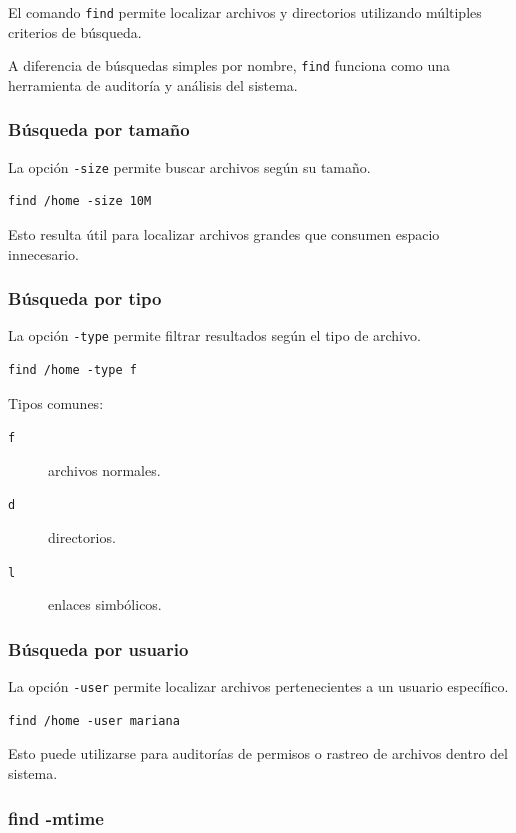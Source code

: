 \documentclass[11pt, letterpaper]{article}
\begin{document}
El comando \texttt{find} permite localizar archivos y directorios utilizando múltiples criterios de búsqueda.

A diferencia de búsquedas simples por nombre, \texttt{find} funciona como una herramienta de auditoría y análisis del sistema.
\subsubsection{Búsqueda por tamaño}
\label{sec:orgbc54884}

La opción \texttt{-size} permite buscar archivos según su tamaño.

\begin{verbatim}
find /home -size 10M
\end{verbatim}

Esto resulta útil para localizar archivos grandes que consumen espacio innecesario.
\subsubsection{Búsqueda por tipo}
\label{sec:org5e5c887}

La opción \texttt{-type} permite filtrar resultados según el tipo de archivo.

\begin{verbatim}
find /home -type f
\end{verbatim}

Tipos comunes:
\begin{description}
\item[{\texttt{f}}] archivos normales.
\item[{\texttt{d}}] directorios.
\item[{\texttt{l}}] enlaces simbólicos.
\end{description}
\subsubsection{Búsqueda por usuario}
\label{sec:org8813e5f}

La opción \texttt{-user} permite localizar archivos pertenecientes a un usuario específico.

\begin{verbatim}
find /home -user mariana
\end{verbatim}

Esto puede utilizarse para auditorías de permisos o rastreo de archivos dentro del sistema.
\subsubsection{find -mtime}
\label{sec:orgc87174a}
\end{document}
